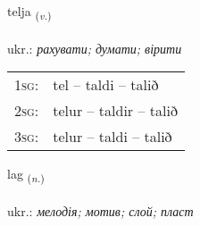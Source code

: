 \documentclass[frontgrid, backgrid]{flacards}\usepackage[]{graphicx}\usepackage[]{xcolor}
\begin{document}
\renewcommand{\blhead}{\vskip5pt {\small\bfseries\footnotesize Sagnorð | дієслово }}
\renewcommand{\bcfoot}{\vskip5pt \hspace{2pt}{\small\bfseries\footnotesize 1K}}


{telja \small{\textsubscript{(\textit{v.})}} \\[1ex] %
\textphonetic{[tʰɛlja]} \\
ukr.: \emph{рахувати; думати; вірити} \\  [2ex]
\renewcommand*{\arraystretch}{0.8}
\begin{tabular}{p{1cm}l}
\textsc{1sg}: & tel -- taldi -- talið \\ 
\textsc{2sg}: & telur -- taldir -- talið \\ 
\textsc{3sg}: & telur -- taldi -- talið \\ 
\end{tabular}
}

\renewcommand{\flhead}{\vskip5pt \fboxsep=0pt {\small\bfseries\footnotesize Nafnorð | іменник}}
\renewcommand{\fcfoot}{\vskip5pt \fboxsep=0pt \hspace{2pt}{\small\bfseries\footnotesize 1K}}

\renewcommand{\blhead}{\vskip5pt {\small\bfseries\footnotesize Nafnorð | іменник }}
\renewcommand{\bcfoot}{\vskip5pt \hspace{2pt}{\small\bfseries\footnotesize 1K}}


{lag \small{\textsubscript{(\textit{n.})}} \\[1ex] %
\textphonetic{[laːɣ]} \\
ukr.: \emph{мелодія; мотив; слой; пласт} \\  [2ex]
\renewcommand*{\arraystretch}{0.8}
}

\end{document}
